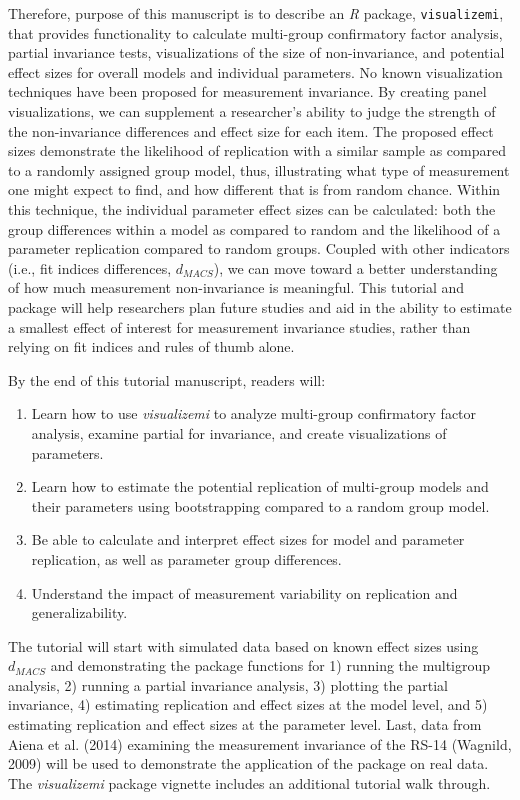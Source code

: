 \documentclass[
  man]{apa7}
\providecommand{\tightlist}{%
  \setlength{\itemsep}{0pt}\setlength{\parskip}{0pt}}
\begin{document}
Therefore, purpose of this manuscript is to describe an \emph{R} package, \texttt{visualizemi}, that provides functionality to calculate multi-group confirmatory factor analysis, partial invariance tests, visualizations of the size of non-invariance, and potential effect sizes for overall models and individual parameters. No known visualization techniques have been proposed for measurement invariance. By creating panel visualizations, we can supplement a researcher's ability to judge the strength of the non-invariance differences and effect size for each item. The proposed effect sizes demonstrate the likelihood of replication with a similar sample as compared to a randomly assigned group model, thus, illustrating what type of measurement one might expect to find, and how different that is from random chance. Within this technique, the individual parameter effect sizes can be calculated: both the group differences within a model as compared to random and the likelihood of a parameter replication compared to random groups. Coupled with other indicators (i.e., fit indices differences, \(d_{MACS}\)), we can move toward a better understanding of how much measurement non-invariance is meaningful. This tutorial and package will help researchers plan future studies and aid in the ability to estimate a smallest effect of interest for measurement invariance studies, rather than relying on fit indices and rules of thumb alone.

By the end of this tutorial manuscript, readers will:

\begin{enumerate}
\def\labelenumi{\arabic{enumi}.}
\tightlist
\item
  Learn how to use \emph{visualizemi} to analyze multi-group confirmatory factor analysis, examine partial for invariance, and create visualizations of parameters.
\item
  Learn how to estimate the potential replication of multi-group models and their parameters using bootstrapping compared to a random group model.
\item
  Be able to calculate and interpret effect sizes for model and parameter replication, as well as parameter group differences.
\item
  Understand the impact of measurement variability on replication and generalizability.
\end{enumerate}

The tutorial will start with simulated data based on known effect sizes using \(d_{MACS}\) and demonstrating the package functions for 1) running the multigroup analysis, 2) running a partial invariance analysis, 3) plotting the partial invariance, 4) estimating replication and effect sizes at the model level, and 5) estimating replication and effect sizes at the parameter level. Last, data from Aiena et al. (2014) examining the measurement invariance of the RS-14 (Wagnild, 2009) will be used to demonstrate the application of the package on real data. The \emph{visualizemi} package vignette includes an additional tutorial walk through.
\end{document}
